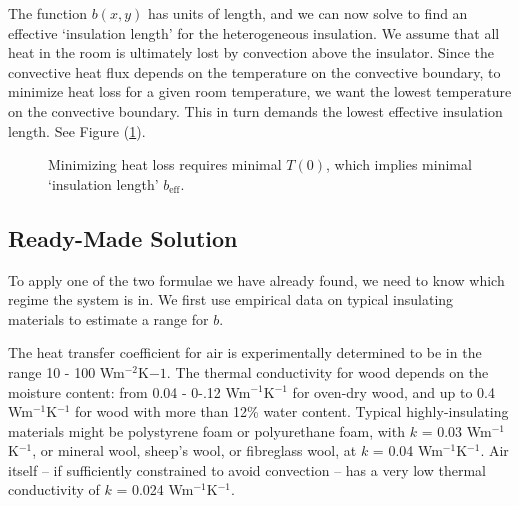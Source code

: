 \documentclass[12pt, a4paper, twoside, openright]{book}
\newcommand{\beff}{\ensuremath{b_{\mathrm{eff}}}}
\newcommand{\Tr}{\ensuremath{T_{\mathrm{room}}}}
\begin{document}
The function $b(x,y)$ has units of length, and we can now solve to find an effective `insulation length' for the heterogeneous insulation.
We assume that all heat in the room is ultimately lost by convection above the insulator.  Since the convective heat flux depends on the temperature on the convective boundary,
  to minimize heat loss for a given room temperature, we want the lowest temperature on the convective boundary.  This in turn demands the lowest effective insulation length.  See Figure (\ref{insulationlength}).

\begin{figure}[ht]
\centering
{}
\caption{Minimizing heat loss requires minimal $T(0)$, which implies minimal `insulation length' $\beff$.}\label{insulationlength}
\end{figure}


\subsection{Ready-Made Solution}

To apply one of the two formulae we have already found, we need to know which regime the system is in.  We first use empirical data on typical insulating materials to estimate a range for $b$. 



The heat transfer coefficient for air is experimentally determined to be in the range 10 - 100 Wm$^{-2}$K${-1}$.
The thermal conductivity for wood depends on the moisture content: from 0.04 - 0-.12 Wm$^{-1}$K$^{-1}$ for oven-dry wood, and up to 0.4 Wm$^{-1}$K$^{-1}$ for wood with more than 12\% water content.
Typical highly-insulating materials might be polystyrene foam or polyurethane foam, with $k$ = 0.03 Wm$^{-1}$K$^{-1}$, or mineral wool, sheep's wool, or fibreglass wool, at $k$ = 0.04 Wm$^{-1}$K$^{-1}$.
Air itself -- if sufficiently constrained to avoid convection -- has a very low thermal conductivity of $k$ = 0.024 Wm$^{-1}$K$^{-1}$.
\end{document}
